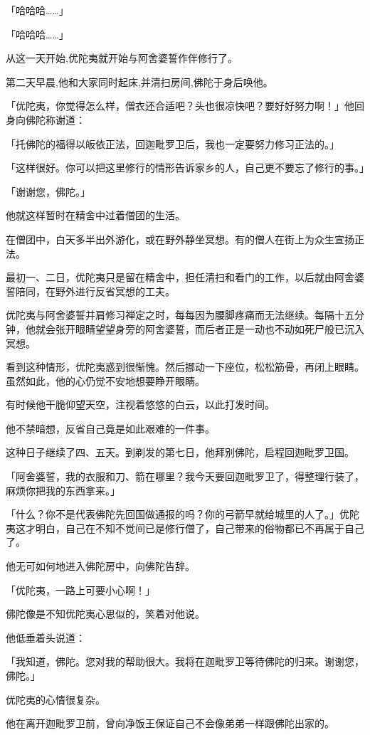 \documentclass[twoside,openany]{book}
\begin{document}
「哈哈哈……」

「哈哈哈……」

从这一天开始,优陀夷就开始与阿舍婆誓作伴修行了。

第二天早晨,他和大家同时起床,并清扫房间,佛陀于身后唤他。

「优陀夷，你觉得怎么样，僧衣还合适吧？头也很凉快吧？要好好努力啊！」他回身向佛陀称谢道：

「托佛陀的福得以皈依正法，回迦毗罗卫后，我也一定要努力修习正法的。」

「这样很好。你可以把这里修行的情形告诉家乡的人，自己更不要忘了修行的事。」

「谢谢您，佛陀。」

他就这样暂时在精舍中过着僧团的生活。

在僧团中，白天多半出外游化，或在野外静坐冥想。有的僧人在街上为众生宣扬正法。

最初一、二日，优陀夷只是留在精舍中，担任清扫和看门的工作，以后就由阿舍婆誓陪同，在野外进行反省冥想的工夫。

优陀夷与阿舍婆誓并肩修习禅定之时，每每因为腰脚疼痛而无法继续。每隔十五分钟，他就会张开眼睛望望身旁的阿舍婆誓，而后者正是一动也不动如死尸般已沉入冥想。

看到这种情形，优陀夷惑到很惭愧。然后挪动一下座位，松松筋骨，再闭上眼睛。虽然如此，他的心仍觉不安地想要睁开眼睛。

有时候他干脆仰望天空，注视着悠悠的白云，以此打发时间。

他不禁暗想，反省自己竟是如此艰难的一件事。

这种日子继续了四、五天。到剃发的第七日，他拜别佛陀，启程回迦毗罗卫国。

「阿舍婆誓，我的衣服和刀、箭在哪里？我今天要回迦毗罗卫了，得整理行装了，麻烦你把我的东西拿来。」

「什么？你不是代表佛陀先回国做通报的吗？你的弓箭早就给城里的人了。」优陀夷这才明白，自己在不知不觉间已是修行僧了，自己带来的俗物都已不再属于自己了。

他无可如何地进入佛陀房中，向佛陀告辞。

「优陀夷，一路上可要小心啊！」

佛陀像是不知优陀夷心思似的，笑着对他说。

他低垂着头说道：

「我知道，佛陀。您对我的帮助很大。我将在迦毗罗卫等待佛陀的归来。谢谢您，佛陀。」

优陀夷的心情很复杂。

他在离开迦毗罗卫前，曾向净饭王保证自己不会像弟弟一样跟佛陀出家的。
\end{document}

